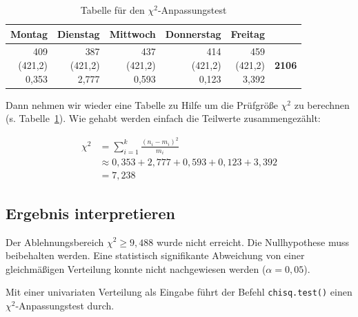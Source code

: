 \documentclass[
  11pt,
  ngerman,
  a4paper,
]{report}
\newenvironment{rtip}{
  \medskip
  \begin{tcolorbox}[colframe=purple,colback=light_gray,title=Softwarehinweis]
}{
  \end{tcolorbox}
  \medskip
}
\begin{document}
\begin{table}

\caption{\label{tab:xtlate}Tabelle für den $\chi^2$-Anpassungstest}
\centering
\begin{tabular}[t]{rrrr>{}r|>{}r}
\toprule
\textbf{Montag} & \textbf{Dienstag} & \textbf{Mittwoch} & \textbf{Donnerstag} & \textbf{Freitag} & \textbf{  }\\
\midrule
\makecell[tr]{409\\(421,2)\\\textcolor{goethe_blue}{0,353}} & \makecell[tr]{387\\(421,2)\\\textcolor{goethe_blue}{2,777}} & \makecell[tr]{437\\(421,2)\\\textcolor{goethe_blue}{0,593}} & \makecell[tr]{414\\(421,2)\\\textcolor{goethe_blue}{0,123}} & \makecell[tr]{459\\(421,2)\\\textcolor{goethe_blue}{3,392}} & \textbf{2106}\\
\bottomrule
\end{tabular}
\end{table}

Dann nehmen wir wieder eine Tabelle zu Hilfe um die Prüfgröße \(\chi^2\) zu berechnen (s. Tabelle~\ref{tab:xtlate}). Wie gehabt werden einfach die Teilwerte zusammengezählt:

\[
\begin{aligned}
\chi^2 &= \sum_{i=1}^{k}\frac{(n_{i}-m_{i})^{2}}{m_{i}}\\[4pt]
&\approx 0{,}353 +  2{,}777 + 0{,}593 + 0{,}123 +  3{,}392 \\
&=7{,}238
\end{aligned}
\]

\hypertarget{ergebnis-interpretieren-3}{%
\subsection{Ergebnis interpretieren}\label{ergebnis-interpretieren-3}}

Der Ablehnungsbereich \(\chi^2 \geq 9{,}488\) wurde nicht erreicht. Die Nullhypothese muss beibehalten werden. Eine statistisch signifikante Abweichung von einer gleichmäßigen Verteilung konnte nicht nachgewiesen werden (\(\alpha=0{,}05\)).

\begin{rtip}
Mit einer univariaten Verteilung als Eingabe führt der Befehl \verb|chisq.test()| einen $\chi^2$-Anpassungstest durch.
\end{rtip}
\end{document}

